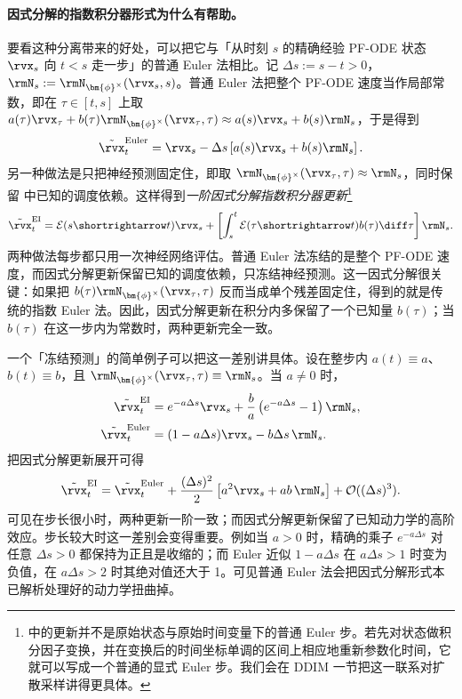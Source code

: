 \paragraph{因式分解的指数积分器形式为什么有帮助。}
要看这种分离带来的好处，可以把它与「从时刻 $s$ 的精确经验 PF-ODE 状态 $\rvx_s$ 向 $t<s$ 走一步」的普通 Euler 法相比。记 $\Delta s:=s-t>0$，$\rmN_s:=\rmN_{\bm{\phi}^\times}(\rvx_s,s)$。普通 Euler 法把整个 PF-ODE 速度当作局部常数，即在 $\tau\in[t,s]$ 上取
$a(\tau)\rvx_\tau+
b(\tau)\rmN_{\bm{\phi}^\times}(\rvx_\tau,\tau)
\approx a(s)\rvx_s+b(s)\rmN_s$，于是得到
\begin{align}
\label{eq:euler-step}
\tilde\rvx_t^{\mathrm{Euler}}
=
\rvx_s
-
\Delta s
\left[
a(s)\rvx_s+b(s)\rmN_s
\right].
\end{align}
另一种做法是只把神经预测固定住，即取 $\rmN_{\bm{\phi}^\times}(\rvx_\tau,\tau)\approx\rmN_s$，同时保留  中已知的调度依赖。这样得到\emph{一阶因式分解指数积分器更新}\footnote{ 中的更新并不是原始状态与原始时间变量下的普通 Euler 步。若先对状态做积分因子变换，并在变换后的时间坐标单调的区间上相应地重新参数化时间，它就可以写成一个普通的显式 Euler 步。我们会在 DDIM 一节把这一联系对扩散采样讲得更具体。}
\begin{align}
\label{eq:factored-ei-step}
\tilde\rvx_t^{\mathrm{EI}}
=
\mathcal E(s\shortrightarrow t)\rvx_s
+
\left[
\int_s^t
\mathcal E(\tau\shortrightarrow t)b(\tau)\diff\tau
\right]\rmN_s.
\end{align}
两种做法每步都只用一次神经网络评估。普通 Euler 法冻结的是整个 PF-ODE 速度，而因式分解更新保留已知的调度依赖，只冻结神经预测。这一因式分解很关键：如果把 $b(\tau)\rmN_{\bm{\phi}^\times}(\rvx_\tau,\tau)$ 反而当成单个残差固定住，得到的就是传统的指数 Euler 法。因此，因式分解更新在积分内多保留了一个已知量 $b(\tau)$；当 $b(\tau)$ 在这一步内为常数时，两种更新完全一致。

一个「冻结预测」的简单例子可以把这一差别讲具体。设在整步内 $a(t)\equiv a$、$b(t)\equiv b$，且 $\rmN_{\bm{\phi}^\times}(\rvx_\tau,\tau)\equiv\rmN_s$。当 $a\neq0$ 时，
\begin{align*}
\tilde\rvx_t^{\mathrm{EI}}
&=
e^{-a\Delta s}\rvx_s
+
\frac{b}{a}
\left(
e^{-a\Delta s}-1
\right)\rmN_s,
\\
\tilde\rvx_t^{\mathrm{Euler}}
&=
(1-a\Delta s)\rvx_s
-
b\Delta s\,\rmN_s.
\end{align*}
把因式分解更新展开可得
\begin{align*}
\tilde\rvx_t^{\mathrm{EI}}
=
\tilde\rvx_t^{\mathrm{Euler}}
+
\frac{(\Delta s)^2}{2}
\left[
a^2\rvx_s
+
ab\,\rmN_s
\right]
+
\mathcal O((\Delta s)^3).
\end{align*}
可见在步长很小时，两种更新一阶一致；而因式分解更新保留了已知动力学的高阶效应。步长较大时这一差别会变得重要。例如当 $a>0$ 时，精确的乘子 $e^{-a\Delta s}$ 对任意 $\Delta s>0$ 都保持为正且是收缩的；而 Euler 近似 $1-a\Delta s$ 在 $a\Delta s>1$ 时变为负值，在 $a\Delta s>2$ 时其绝对值还大于 1。可见普通 Euler 法会把因式分解形式本已解析处理好的动力学扭曲掉。

